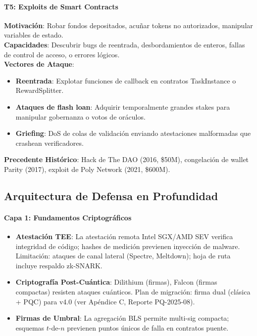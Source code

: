 \documentclass[11pt]{article}
\begin{document}
\paragraph{T5: Exploits de Smart Contracts}
\textbf{Motivación}: Robar fondos depositados, acuñar tokens no autorizados, manipular variables de estado.\\
\textbf{Capacidades}: Descubrir bugs de reentrada, desbordamientos de enteros, fallas de control de acceso, o errores lógicos.\\
\textbf{Vectores de Ataque}:
\begin{itemize}[noitemsep]
  \item \textbf{Reentrada}: Explotar funciones de callback en contratos TaskInstance o RewardSplitter.
  \item \textbf{Ataques de flash loan}: Adquirir temporalmente grandes stakes para manipular gobernanza o votos de oráculos.
  \item \textbf{Griefing}: DoS de colas de validación enviando atestaciones malformadas que crashean verificadores.
\end{itemize}
\textbf{Precedente Histórico}: Hack de The DAO (2016, \$50M), congelación de wallet Parity (2017), exploit de Poly Network (2021, \$600M).

\subsection{Arquitectura de Defensa en Profundidad}

\paragraph{Capa 1: Fundamentos Criptográficos}
\begin{itemize}[noitemsep]
  \item \textbf{Atestación TEE}: La atestación remota Intel SGX/AMD SEV verifica integridad de código; hashes de medición previenen inyección de malware. Limitación: ataques de canal lateral (Spectre, Meltdown); hoja de ruta incluye respaldo zk-SNARK.
  \item \textbf{Criptografía Post-Cuántica}: Dilithium (firmas), Falcon (firmas compactas) resisten ataques cuánticos. Plan de migración: firma dual (clásica + PQC) para v4.0 (ver Apéndice C, Reporte PQ-2025-08).
  \item \textbf{Firmas de Umbral}: La agregación BLS permite multi-sig compacta; esquemas $t$-de-$n$ previenen puntos únicos de falla en contratos puente.
\end{itemize}
\end{document}
